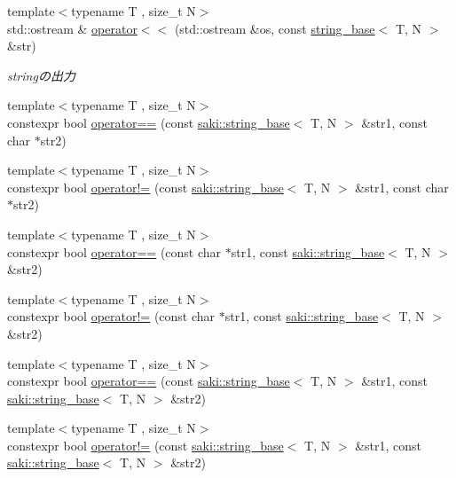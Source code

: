 \begin{DoxyCompactItemize}
{\footnotesize template$<$typename T , size\+\_\+t N$>$ }\\std\+::ostream \& \mbox{\hyperlink{namespacesaki_abf390d4e6c19fdb92d3a68afb7e71032}{operator$<$$<$}} (std\+::ostream \&os, const \mbox{\hyperlink{classsaki_1_1string__base}{string\+\_\+base}}$<$ T, N $>$ \&str)
\begin{DoxyCompactList}\small\item\em stringの出力 \end{DoxyCompactList}\item 
{\footnotesize template$<$typename T , size\+\_\+t N$>$ }\\constexpr bool \mbox{\hyperlink{namespacesaki_a1f5c975d021d701e0360608eb7a872eb}{operator==}} (const \mbox{\hyperlink{classsaki_1_1string__base}{saki\+::string\+\_\+base}}$<$ T, N $>$ \&str1, const char $\ast$str2)
\item 
{\footnotesize template$<$typename T , size\+\_\+t N$>$ }\\constexpr bool \mbox{\hyperlink{namespacesaki_a7637dfb057d475605a3564df27789e60}{operator!=}} (const \mbox{\hyperlink{classsaki_1_1string__base}{saki\+::string\+\_\+base}}$<$ T, N $>$ \&str1, const char $\ast$str2)
\item 
{\footnotesize template$<$typename T , size\+\_\+t N$>$ }\\constexpr bool \mbox{\hyperlink{namespacesaki_aeab22d0272e78c7d3a44ce241259c996}{operator==}} (const char $\ast$str1, const \mbox{\hyperlink{classsaki_1_1string__base}{saki\+::string\+\_\+base}}$<$ T, N $>$ \&str2)
\item 
{\footnotesize template$<$typename T , size\+\_\+t N$>$ }\\constexpr bool \mbox{\hyperlink{namespacesaki_a155d8277bf6806453219cc8145920fbd}{operator!=}} (const char $\ast$str1, const \mbox{\hyperlink{classsaki_1_1string__base}{saki\+::string\+\_\+base}}$<$ T, N $>$ \&str2)
\item 
{\footnotesize template$<$typename T , size\+\_\+t N$>$ }\\constexpr bool \mbox{\hyperlink{namespacesaki_a69af90ebb2b8a4f7bf399a381a8898c9}{operator==}} (const \mbox{\hyperlink{classsaki_1_1string__base}{saki\+::string\+\_\+base}}$<$ T, N $>$ \&str1, const \mbox{\hyperlink{classsaki_1_1string__base}{saki\+::string\+\_\+base}}$<$ T, N $>$ \&str2)
\item 
{\footnotesize template$<$typename T , size\+\_\+t N$>$ }\\constexpr bool \mbox{\hyperlink{namespacesaki_a97d9fc5d2082989be021e821379631d0}{operator!=}} (const \mbox{\hyperlink{classsaki_1_1string__base}{saki\+::string\+\_\+base}}$<$ T, N $>$ \&str1, const \mbox{\hyperlink{classsaki_1_1string__base}{saki\+::string\+\_\+base}}$<$ T, N $>$ \&str2)

\end{DoxyCompactItemize}
